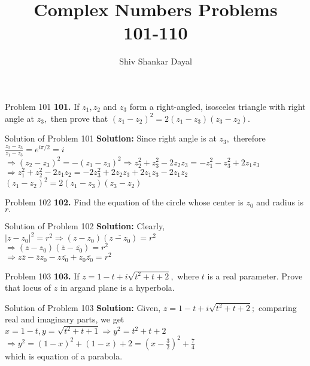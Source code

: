 \documentclass[aspectratio=169,8pt]{beamer}
\title{Complex Numbers Problems\\ 101-110}
\author[Shiv Shankar Dayal]{Shiv Shankar Dayal}
\begin{document}
\begin{frame}
  \titlepage
\end{frame}
\begin{frame}{Problem 101}
  \textbf{101.} If $z_1, z_2$ and $z_3$ form a right-angled, isosceles triangle with right angle at $z_3,$ then prove that $(z_1 -
  z_2)^2 = 2(z_1 - z_3)(z_3 - z_2).$
\end{frame}
\begin{frame}{Solution of Problem 101}
  \textbf{Solution:} Since right angle is at $z_3,$ therefore $\frac{z_2 - z_3}{z_1 - z_3} = e^{i\pi/2} = i$\\
  \vspace*{0.2cm}
  $\Rightarrow (z_2 - z_3)^2 = -(z_1 - z_3)^2 \Rightarrow z_2^2 + z_3^2 - 2z_2z_3 = -z_1^2 - z_3^2 + 2z_1z_3$\\
  \vspace*{0.2cm}
  $\Rightarrow z_1^2 + z_2^2 - 2z_1z_2 = -2z_3^2 + 2z_2z_3 + 2z_1z_3 - 2z_1z_2$\\
  \vspace*{0.2cm}
  $(z_1 - z_2)^2 = 2(z_1 - z_3)(z_3 - z_2)$
\end{frame}
\begin{frame}{Problem 102}
  \textbf{102.} Find the equation of the circle whose center is $z_0$ and radius is $r.$
\end{frame}
\begin{frame}{Solution of Problem 102}
  \textbf{Solution:} Clearly, $|z - z_0|^2 = r^2 \Rightarrow (z - z_0)(\overline{z - z_0}) = r^2$\\
  \vspace*{0.2cm}
  $\Rightarrow (z - z_0)(\overline{z} - \overline{z_0}) = r^2$\\
  \vspace*{0.2cm}
  $\Rightarrow z\overline{z} - \overline{z}z_0 - z\overline{z_0} + z_0\overline{z_0} = r^2$
\end{frame}
\begin{frame}{Problem 103}
  \textbf{103.} If $z = 1 - t + i\sqrt{t^2 + t + 2},$ where $t$ is a real parameter. Prove that locus of $z$ in argand plane is a
  hyperbola.
\end{frame}
\begin{frame}{Solution of Problem 103}
  \textbf{Solution:} Given, $z = 1 - t + i\sqrt{t^2 + t + 2};$ comparing real and imaginary parts, we get\\
  \vspace*{0.2cm}
  $x = 1 - t, y = \sqrt{t^2 + t + 1} \Rightarrow y^2 = t^2 + t + 2$\\
  \vspace*{0.2cm}
  $\Rightarrow y^2 = (1 - x)^2 + (1 - x) + 2 = \left(x - \frac{3}{2}\right)^2 + \frac{7}{4}$\\
  \vspace*{0.2cm}
  which is equation of a parabola.
\end{frame}
\end{document}
